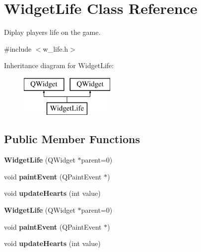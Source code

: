 \hypertarget{class_widget_life}{}\section{Widget\+Life Class Reference}
\label{class_widget_life}


Diplay player\textquotesingle{}s life on the game.  




{\ttfamily \#include $<$w\+\_\+life.\+h$>$}

Inheritance diagram for Widget\+Life\+:\begin{figure}[H]
\begin{center}
\leavevmode
\includegraphics[height=2.000000cm]{class_widget_life}
\end{center}
\end{figure}
\subsection*{Public Member Functions}
\begin{DoxyCompactItemize}
\item 
\hypertarget{class_widget_life_a1d39aa69bd9872b67d0e5164f0bb1ca8}{}{\bfseries Widget\+Life} (Q\+Widget $\ast$parent=0)\label{class_widget_life_a1d39aa69bd9872b67d0e5164f0bb1ca8}

\item 
\hypertarget{class_widget_life_ab41e1bce66c7891a9f6f64d42d4f6055}{}void {\bfseries paint\+Event} (Q\+Paint\+Event $\ast$)\label{class_widget_life_ab41e1bce66c7891a9f6f64d42d4f6055}

\item 
\hypertarget{class_widget_life_af27cf30c08d8a7a85e29a0a3e2fae0b0}{}void {\bfseries update\+Hearts} (int value)\label{class_widget_life_af27cf30c08d8a7a85e29a0a3e2fae0b0}

\item 
\hypertarget{class_widget_life_a1d39aa69bd9872b67d0e5164f0bb1ca8}{}{\bfseries Widget\+Life} (Q\+Widget $\ast$parent=0)\label{class_widget_life_a1d39aa69bd9872b67d0e5164f0bb1ca8}

\item 
\hypertarget{class_widget_life_ab41e1bce66c7891a9f6f64d42d4f6055}{}void {\bfseries paint\+Event} (Q\+Paint\+Event $\ast$)\label{class_widget_life_ab41e1bce66c7891a9f6f64d42d4f6055}

\item 
\hypertarget{class_widget_life_af27cf30c08d8a7a85e29a0a3e2fae0b0}{}void {\bfseries update\+Hearts} (int value)\label{class_widget_life_af27cf30c08d8a7a85e29a0a3e2fae0b0}

\end{DoxyCompactItemize}


